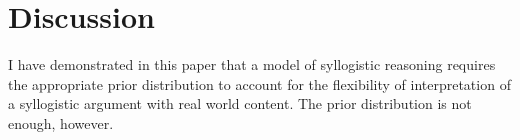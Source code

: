 \documentclass{llncs} %
\begin{document}
\section{Discussion}

I have demonstrated in this paper that a model of syllogistic reasoning requires the appropriate prior distribution to account for the flexibility of interpretation of a syllogistic argument with real world content. The prior distribution is not enough, however. 





\end{document}
